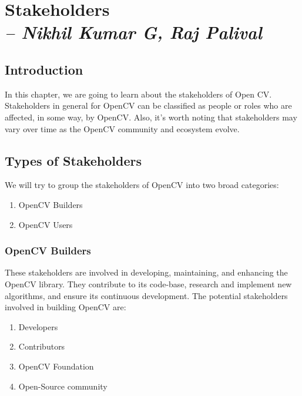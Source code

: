 \chapter{Stakeholders\\
\small{\textit{-- Nikhil Kumar G, Raj Palival}}
\label{Chapter::Stakeholders}}

\section{Introduction \label{Section::StakeholdersIntroduction}}
In this chapter, we are going to learn about the stakeholders of Open CV. Stakeholders in general for OpenCV can be classified as people or roles who are affected, in some way, by OpenCV. Also, it's worth noting that stakeholders may vary over time as the OpenCV community and ecosystem evolve.

\section{Types of Stakeholders \label{Section::StakeholdersType}}
We will try to group the stakeholders of OpenCV into two broad categories:
\begin{enumerate}
     \item OpenCV Builders
     \item OpenCV Users
 \end{enumerate}
 
\subsection{OpenCV Builders \label{subSection::OpenCVBuilders}}
These stakeholders are involved in developing, maintaining, and enhancing the OpenCV library. They contribute to its code-base, research and implement new algorithms, and ensure its continuous development. The potential stakeholders involved in building OpenCV are:
\begin{enumerate}
     \item Developers
     \item Contributors
     \item OpenCV Foundation
     \item Open-Source community
 \end{enumerate}

